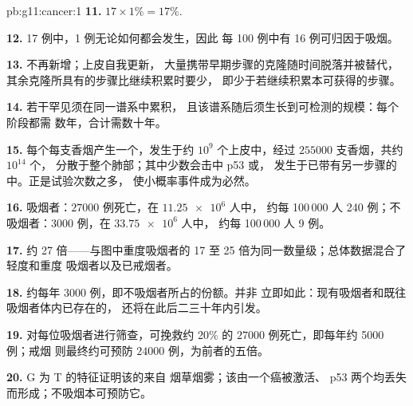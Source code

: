 \begin{solution}{pb:g11:cancer:1}
\textbf{11.} $17 \times 1\% = 17\%$.

\textbf{12.} 17 例中，1 例无论如何都会发生，因此
每 100 例中有 16 例可归因于吸烟。

\textbf{13.} 不再新增；上皮自我更新，
大量携带早期步骤的克隆随时间脱落并被替代，
其余克隆所具有的步骤比继续积累时要少，
即少于若继续积累本可获得的步骤。

\textbf{14.} 若干罕见须在同一谱系中累积，
且该谱系随后须生长到可检测的规模：每个阶段都需
数年，合计需数十年。

\textbf{15.} 每个每支香烟产生一个，发生于约 $10^9$
个上皮中，经过 $\num{255000}$ 支香烟，共约 $10^{14}$ 个，
分散于整个肺部；其中少数会击中 p53 或，
发生于已带有另一步骤的中。正是试验次数之多，
使小概率事件成为必然。

\textbf{16.} 吸烟者：$\num{27000}$ 例死亡，在 $\num{11.25e6}$ 人中，
约每 100\,000 人 240 例；不吸烟者：3000 例，在 $\num{33.75e6}$ 人中，
约每 100\,000 人 9 例。

\textbf{17.} 约 27 倍——与图中重度吸烟者的 17
至 25 倍为同一数量级；总体数据混合了轻度和重度
吸烟者以及已戒烟者。

\textbf{18.} 约每年 3000 例，即不吸烟者所占的份额。并非
立即如此：现有吸烟者和既往吸烟者体内已存在的，
还将在此后二三十年内引发。

\textbf{19.} 对每位吸烟者进行筛查，可挽救约 20\% 的
$\num{27000}$ 例死亡，即每年约 5000 例；戒烟
则最终约可预防 $\num{24000}$ 例，为前者的五倍。

\textbf{20.} G 为 T 的特征证明该的来自
烟草烟雾；该由一个癌被激活、
p53 两个均丢失而形成；不吸烟本可预防它。
\end{solution}
